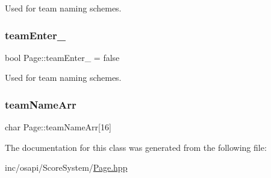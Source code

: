 Used for team naming schemes. 

\mbox{\label{class_page_a34b443eebdb2ae4f0233be759cd725ae}} 
\subsubsection{\texorpdfstring{team\+Enter\+\_\+}{teamEnter\_}}
{\footnotesize\ttfamily bool Page\+::team\+Enter\+\_\+ = false\hspace{0.3cm}{\ttfamily [private]}}



Used for team naming schemes. 

\mbox{\label{class_page_ac354cb7bc8c03459179a5c2c1628d5ed}} 
\subsubsection{\texorpdfstring{team\+Name\+Arr}{teamNameArr}}
{\footnotesize\ttfamily char Page\+::team\+Name\+Arr\mbox{[}16\mbox{]}\hspace{0.3cm}{\ttfamily [private]}}



The documentation for this class was generated from the following file\+:\begin{DoxyCompactItemize}
\item 
inc/osapi/\+Score\+System/\hyperlink{_page_8hpp}{Page.\+hpp}\end{DoxyCompactItemize}
